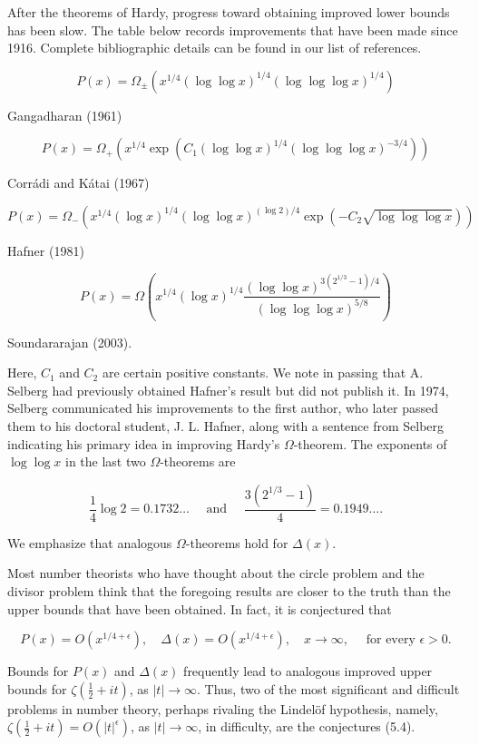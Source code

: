 \documentclass[10pt]{article}
\theoremstyle{plain}
\begin{document}
After the theorems of Hardy, progress toward obtaining improved lower bounds has been slow. The table below records improvements that have been made since 1916. Complete bibliographic details can be found in our list of references.

$$
P(x)=\Omega_{ \pm}\left(x^{1 / 4}(\log \log x)^{1 / 4}(\log \log \log x)^{1 / 4}\right)
$$

Gangadharan (1961)

$$
P(x)=\Omega_{+}\left(x^{1 / 4} \exp \left(C_{1}(\log \log x)^{1 / 4}(\log \log \log x)^{-3 / 4}\right)\right)
$$

Corrádi and Kátai (1967)

$$
P(x)=\Omega_{-}\left(x^{1 / 4}(\log x)^{1 / 4}(\log \log x)^{(\log 2) / 4} \exp \left(-C_{2} \sqrt{\log \log \log x}\right)\right)
$$

Hafner (1981)

$$
P(x)=\Omega\left(x^{1 / 4}(\log x)^{1 / 4} \frac{(\log \log x)^{3\left(2^{1 / 3}-1\right) / 4}}{(\log \log \log x)^{5 / 8}}\right)
$$

Soundararajan (2003).

Here, $C_{1}$ and $C_{2}$ are certain positive constants. We note in passing that A. Selberg had previously obtained Hafner's result but did not publish it. In 1974, Selberg communicated his improvements to the first author, who later passed them to his doctoral student, J. L. Hafner, along with a sentence from Selberg indicating his primary idea in improving Hardy's $\Omega$-theorem. The exponents of $\log \log x$ in the last two $\Omega$-theorems are

$$
\frac{1}{4} \log 2=0.1732 \ldots \quad \text { and } \quad \frac{3\left(2^{1 / 3}-1\right)}{4}=0.1949 \ldots .
$$

We emphasize that analogous $\Omega$-theorems hold for $\Delta(x)$.

Most number theorists who have thought about the circle problem and the divisor problem think that the foregoing results are closer to the truth than the upper bounds that have been obtained. In fact, it is conjectured that


\begin{equation*}
P(x)=O\left(x^{1 / 4+\epsilon}\right), \quad \Delta(x)=O\left(x^{1 / 4+\epsilon}\right), \quad x \to \infty, \quad \text { for every } \epsilon>0 . \tag{5.4}
\end{equation*}


Bounds for $P(x)$ and $\Delta(x)$ frequently lead to analogous improved upper bounds for $\zeta\left(\frac{1}{2}+i t\right)$, as $|t| \to \infty$. Thus, two of the most significant and difficult problems in number theory, perhaps rivaling the Lindelöf hypothesis, namely, $\zeta\left(\frac{1}{2}+i t\right)=O\left(|t|^{\epsilon}\right)$, as $|t| \to \infty$, in difficulty, are the conjectures (5.4).
\end{document}
